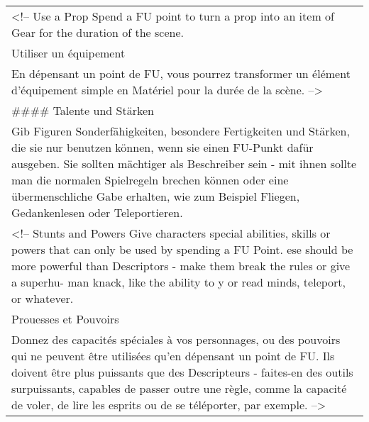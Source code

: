 \documentclass[]{article}
\begin{document}
\begin{longtable}[]{@{}l@{}}
\begin{minipage}[t]{0.05\columnwidth}\raggedright\strut
\textless{}!-- Use a Prop Spend a FU point to turn a prop into an item
of Gear for the duration of the scene.
\strut\end{minipage}\tabularnewline
\begin{minipage}[t]{0.05\columnwidth}\raggedright\strut
Utiliser un équipement
\strut\end{minipage}\tabularnewline
\begin{minipage}[t]{0.05\columnwidth}\raggedright\strut
En dépensant un point de FU, vous pourrez transformer un élément
d'équipement simple en Matériel pour la durée de la scène.
--\textgreater{}
\strut\end{minipage}\tabularnewline
\begin{minipage}[t]{0.05\columnwidth}\raggedright\strut
\#\#\#\# Talente und Stärken
\strut\end{minipage}\tabularnewline
\begin{minipage}[t]{0.05\columnwidth}\raggedright\strut
Gib Figuren Sonderfähigkeiten, besondere Fertigkeiten und Stärken, die
sie nur benutzen können, wenn sie einen FU-Punkt dafür ausgeben. Sie
sollten mächtiger als Beschreiber sein - mit ihnen sollte man die
normalen Spielregeln brechen können oder eine übermenschliche Gabe
erhalten, wie zum Beispiel Fliegen, Gedankenlesen oder Teleportieren.
\strut\end{minipage}\tabularnewline
\begin{minipage}[t]{0.05\columnwidth}\raggedright\strut
\textless{}!-- Stunts and Powers Give characters special abilities,
skills or powers that can only be used by spending a FU Point. ese
should be more powerful than Descriptors - make them break the rules or
give a superhu- man knack, like the ability to y or read minds,
teleport, or whatever.
\strut\end{minipage}\tabularnewline
\begin{minipage}[t]{0.05\columnwidth}\raggedright\strut
Prouesses et Pouvoirs
\strut\end{minipage}\tabularnewline
\begin{minipage}[t]{0.05\columnwidth}\raggedright\strut
Donnez des capacités spéciales à vos personnages, ou des pouvoirs qui ne
peuvent être utilisées qu'en dépensant un point de FU. Ils doivent être
plus puissants que des Descripteurs - faites-en des outils surpuissants,
capables de passer outre une règle, comme la capacité de voler, de lire
les esprits ou de se téléporter, par exemple. --\textgreater{}

\end{minipage}
\end{longtable}
\end{document}
